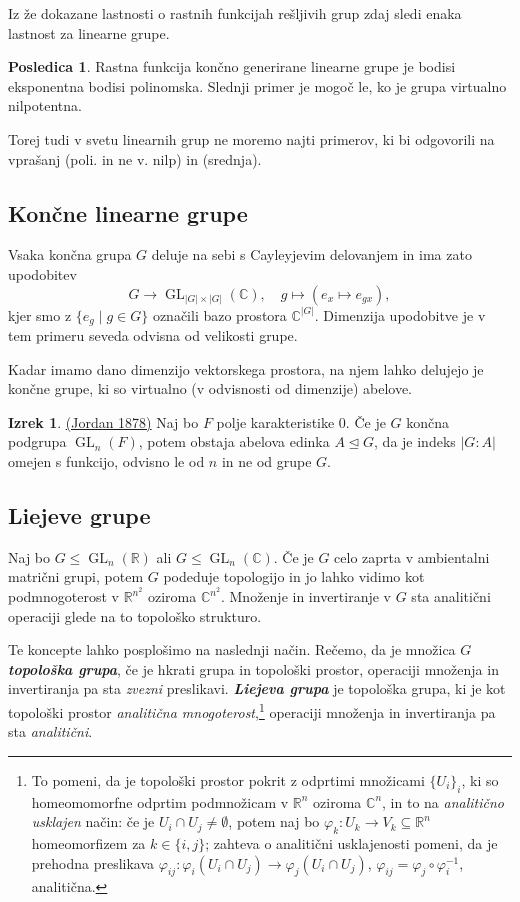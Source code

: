 \documentclass[11pt]{book}
\def\RR{\mathbb{R}}
\def\CC{\mathbb{C}}
\DeclareMathOperator\GL{GL}
\def\definicija{\color{rdeca}\bf\em}
\def\vprasanje{\color{oranzna}}
\theoremstyle{definition}
\theoremstyle{zgled}
\theoremstyle{odprtproblem}
\theoremstyle{domacanaloga}
\theoremstyle{izrek}
\newtheorem*{izrek}{Izrek}
\newtheorem*{posledica}{Posledica}
\begin{document}
Iz že dokazane lastnosti o rastnih funkcijah rešljivih grup zdaj sledi enaka lastnost za linearne grupe.

\begin{posledica}
Rastna funkcija končno generirane linearne grupe je bodisi eksponentna bodisi polinomska. Slednji primer je mogoč le, ko je grupa virtualno nilpotentna.
\end{posledica}

Torej tudi v svetu linearnih grup ne moremo najti primerov, ki bi odgovorili na vprašanj {\vprasanje \sc (poli. in ne v. nilp)} in {\vprasanje \sc (srednja)}.

\subsection{Končne linearne grupe}

Vsaka končna grupa $G$ deluje na sebi s Cayleyjevim delovanjem in ima zato upodobitev
\[
G \to \GL_{|G| \times |G|}(\CC), \quad
g \mapsto (e_x \mapsto e_{gx}),
\]
kjer smo z $\{ e_g \mid g \in G \}$ označili bazo prostora $\CC^{|G|}$. Dimenzija upodobitve je v tem primeru seveda odvisna od velikosti grupe.

Kadar imamo dano dimenzijo vektorskega prostora, na njem lahko delujejo je končne grupe, ki so virtualno (v odvisnosti od dimenzije) abelove.

\begin{izrek}\href{https://www.imo.universite-paris-saclay.fr/~breuilla/Jordan.pdf}{(Jordan 1878)}
Naj bo $F$ polje karakteristike $0$. Če je $G$ končna podgrupa $\GL_n(F)$, potem obstaja abelova edinka $A \unlhd G$, da je indeks $|G:A|$ omejen s funkcijo, odvisno le od $n$ in ne od grupe $G$.
\end{izrek}

\subsection{Liejeve grupe}

Naj bo $G \leq \GL_n(\RR)$ ali $G \leq \GL_n(\CC)$. Če je $G$ celo zaprta v ambientalni matrični grupi, potem $G$ podeduje topologijo in jo lahko vidimo kot podmnogoterost v $\RR^{n^2}$ oziroma $\CC^{n^2}$. Množenje in invertiranje v $G$ sta analitični operaciji glede na to topološko strukturo.

Te koncepte lahko posplošimo na naslednji način. Rečemo, da je množica $G$ {\definicija topološka grupa}, če je hkrati grupa in topološki prostor, operaciji množenja in invertiranja pa sta {\em zvezni} preslikavi. {\definicija Liejeva grupa} je topološka grupa, ki je kot topološki prostor {\em analitična mnogoterost},\footnote{To pomeni, da je topološki prostor pokrit z odprtimi množicami $\{ U_i \}_i$, ki so homeomomorfne odprtim podmnožicam v $\RR^n$ oziroma $\CC^n$, in to na {\em analitično usklajen} način: če je $U_i \cap U_j \neq \emptyset$, potem naj bo $\varphi_k \colon U_k \to V_k \subseteq \RR^n$ homeomorfizem za $k \in \{ i,j \}$; zahteva o analitični usklajenosti pomeni, da je prehodna preslikava $\varphi_{ij} \colon \varphi_i(U_i \cap U_j) \to \varphi_j(U_i \cap U_j)$, $\varphi_{ij} = \varphi_j \circ \varphi_i^{-1}$, analitična.} operaciji množenja in invertiranja pa sta {\em analitični}.
\end{document}
